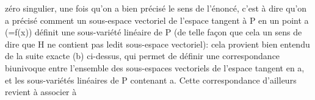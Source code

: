 zéro singulier, une fois qu'on a bien précisé le sens de l'énoncé,
c'est à dire qu'on a précisé comment un  sous-espace
vectoriel de l'espace tangent à P en un point a (=f(x)) définit une
sous-variété linéaire de P (de telle façon que cela  un sens de dire
que H ne contient pas ledit sous-espace vectoriel): cela provient
bien entendu de la suite exacte (b) ci-dessus, qui permet de
définir une correspondance biunivoque entre l'ensemble des sous-espaces
vectoriels de l'espace tangent en a, et les sous-variétés linéaires de
P contenant a. Cette correspondance d'ailleurs revient à associer à

